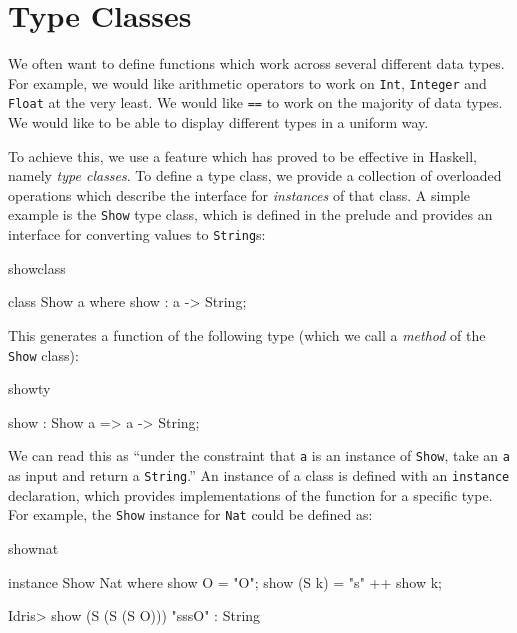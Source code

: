 \section{Type Classes}
\label{sec:classes}

We often want to define functions which work across several different data
types. For example, we would like arithmetic operators to work on \texttt{Int},
\texttt{Integer} and \texttt{Float} at the very least. We would like
\texttt{==} to work on the majority of data types. We would like to be able to
display different types in a uniform way.

To achieve this, we use a feature which has proved to be effective in Haskell, namely
\emph{type classes}. To define a type class, we provide a collection of overloaded
operations which describe the interface for \emph{instances} of that class. A simple example
is the \texttt{Show} type class, which is defined in the prelude and
provides an interface for converting values to
\texttt{String}s:

\begin{SaveVerbatim}{showclass}

class Show a where {
    show : a -> String;
}

\end{SaveVerbatim}

\noindent
This generates a function of the following type (which we call a \emph{method} of the 
\texttt{Show} class):

\begin{SaveVerbatim}{showty}

show : Show a => a -> String;

\end{SaveVerbatim}

\noindent
We can read this as ``under the constraint that \texttt{a} is an instance of \texttt{Show},
take an \texttt{a} as input and return a \texttt{String}.'' An instance of a class
is defined with an \texttt{instance} declaration, which provides implementations of
the function for a specific type. For example, the \texttt{Show} instance for \texttt{Nat}
could be defined as:

\begin{SaveVerbatim}{shownat}

instance Show Nat where {
    show O = "O";
    show (S k) = "s" ++ show k;
}

Idris> show (S (S (S O))) 
"sssO" : String

\end{SaveVerbatim}

